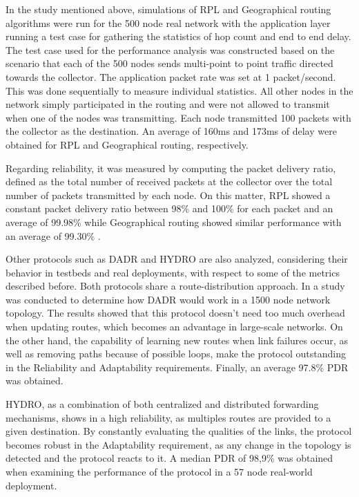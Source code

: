 \documentclass[11pt,final,onecolumn]{IEEEtran}
\begin{document}
In the study mentioned above, simulations of RPL and Geographical routing algorithms were run for the 500 node real network with the application layer running a test case for gathering the statistics of hop count and end to end delay. The test case used for the performance analysis was constructed based on the scenario that each of the 500 nodes sends multi-point to point traffic directed towards the collector. The application packet rate was set at 1 packet/second. This was done sequentially to measure individual statistics. All other nodes in the network simply participated in the routing and were not allowed to transmit when one of the nodes was transmitting. Each node transmitted 100 packets with the collector as the destination. An average of 160ms and 173ms of delay were obtained for RPL and Geographical routing, respectively. 

Regarding reliability, it was measured by computing the packet delivery ratio, defined as the total number of received packets at the collector over the total number of packets transmitted by each node. On this matter, RPL showed a constant packet delivery ratio between 98\% and 100\% for each packet and an average of 99.98\% while Geographical routing showed similar performance with an average of 99.30\% \cite{Iyer2011a}.  

Other protocols such as DADR and HYDRO are also analyzed, considering their behavior in testbeds and real deployments, with respect to some of the metrics described before. Both protocols share a route-distribution approach. In  \cite{Iwao2010} a study was conducted to determine how DADR would work in a 1500 node network topology. The results showed that this protocol doesn’t need too much overhead when updating routes, which becomes an advantage in large-scale networks. On the other hand, the capability of learning new routes when link failures occur, as well as removing paths because of possible loops, make the protocol outstanding in the Reliability and Adaptability requirements. Finally, an average 97.8\% PDR was obtained. 

HYDRO, as a combination of both centralized and distributed forwarding mechanisms, shows in  \cite{Dawson2010} a high reliability, as multiples routes are provided to a given destination.  By constantly evaluating the qualities of the links, the protocol becomes robust in the Adaptability requirement, as any change in the topology is detected and the protocol reacts to it. A median PDR of 98,9\% was obtained when examining the performance of the protocol in a 57 node real-world deployment. 
	
\end{document}
